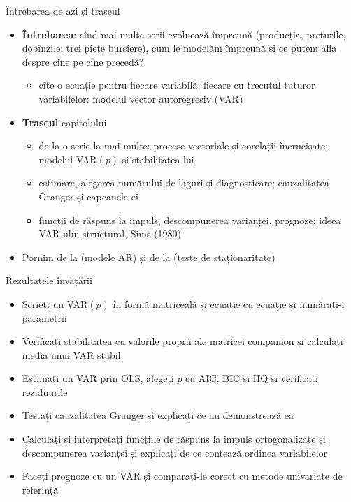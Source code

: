 \begin{frame}{Întrebarea de azi și traseul}
\itemsize{\small}
\begin{itemize}
    \item \textbf{Întrebarea}: cînd mai multe serii evoluează împreună (producția, prețurile, dobînzile; trei piețe bursiere), cum le modelăm împreună și ce putem afla despre cine pe cine precedă?
    \begin{itemize}
        \item cîte o ecuație pentru fiecare variabilă, fiecare cu trecutul tuturor variabilelor: modelul vector autoregresiv (VAR)
    \end{itemize}
    \item \textbf{Traseul} capitolului
    \begin{itemize}
        \item de la o serie la mai multe: procese vectoriale și corelații încrucișate; modelul VAR$(p)$ și stabilitatea lui
        \item estimare, alegerea numărului de laguri și diagnosticare; cauzalitatea Granger și capcanele ei
        \item funcții de răspuns la impuls, descompunerea varianței, prognoze; ideea VAR-ului structural, Sims (1980)
    \end{itemize}
    \item Pornim de la  (modele AR) și de la  (teste de staționaritate)
\end{itemize}
\end{frame}

\begin{frame}{Rezultatele învățării}
\itemsize{\small}
\begin{itemize}
    \item Scrieți un VAR$(p)$ în formă matriceală și ecuație cu ecuație și numărați-i parametrii
    \item Verificați stabilitatea cu valorile proprii ale matricei companion și calculați media unui VAR stabil
    \item Estimați un VAR prin OLS, alegeți $p$ cu AIC, BIC și HQ și verificați reziduurile
    \item Testați cauzalitatea Granger și explicați ce nu demonstrează ea
    \item Calculați și interpretați funcțiile de răspuns la impuls ortogonalizate și descompunerea varianței și explicați de ce contează ordinea variabilelor
    \item Faceți prognoze cu un VAR și comparați-le corect cu metode univariate de referință
\end{itemize}
\end{frame}

